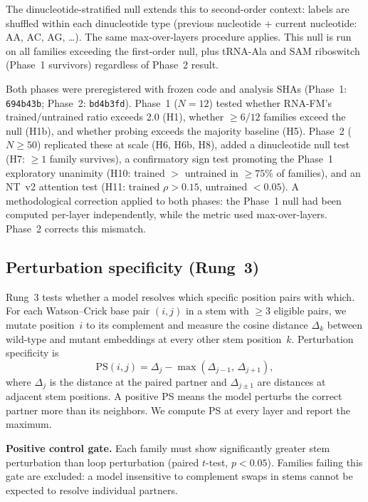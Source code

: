 \documentclass[11pt]{article}
\begin{document}
The dinucleotide-stratified null extends this to second-order context:
labels are shuffled within each dinucleotide type (previous nucleotide
+ current nucleotide: AA, AC, AG, \ldots).  The same max-over-layers
procedure applies.  This null is run on all families exceeding the
first-order null, plus tRNA-Ala and SAM riboswitch (Phase~1 survivors)
regardless of Phase~2 result.

Both phases were preregistered with frozen code and analysis SHAs
(Phase~1: \texttt{694b43b}; Phase~2: \texttt{bd4b3fd}).  Phase~1
($N = 12$) tested whether RNA-FM's trained/untrained ratio exceeds
2.0 (H1), whether $\geq 6/12$ families exceed the null (H1b), and
whether probing exceeds the majority baseline (H5).  Phase~2
($N \geq 50$) replicated these at scale (H6, H6b, H8), added a
dinucleotide null test (H7: $\geq 1$ family survives), a confirmatory
sign test promoting the Phase~1 exploratory unanimity (H10: trained
$>$ untrained in $\geq 75\%$ of families), and an NT~v2 attention
test (H11: trained $\rho > 0.15$, untrained $< 0.05$).  A
methodological correction applied to both phases: the Phase~1 null
had been computed per-layer independently, while the metric used
max-over-layers.  Phase~2 corrects this mismatch.


\subsection{Perturbation specificity (Rung~3)}
\label{sec:rung3_methods}

Rung~3 tests whether a model resolves which specific position pairs
with which.  For each Watson--Crick base pair $(i, j)$ in a stem with
$\geq 3$ eligible pairs, we mutate position~$i$ to its complement and
measure the cosine distance $\Delta_k$ between wild-type and mutant
embeddings at every other stem position~$k$.  Perturbation specificity
is
\[
  \mathrm{PS}(i, j) = \Delta_j - \max(\Delta_{j-1},\, \Delta_{j+1}),
\]
where $\Delta_j$ is the distance at the paired partner and
$\Delta_{j \pm 1}$ are distances at adjacent stem positions.  A
positive PS means the model perturbs the correct partner more than its
neighbors.  We compute PS at every layer and report the maximum.

\textbf{Positive control gate.}  Each family must show significantly
greater stem perturbation than loop perturbation (paired $t$-test,
$p < 0.05$).  Families failing this gate are excluded: a model
insensitive to complement swaps in stems cannot be expected to resolve
individual partners.
\end{document}
